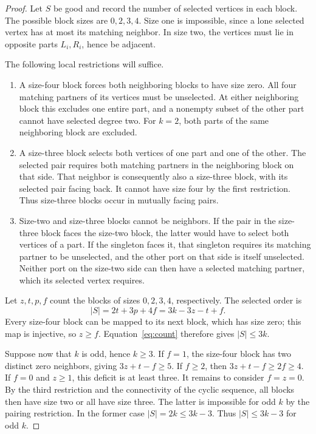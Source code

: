 \documentclass[11pt]{article}
\begin{document}
\begin{proof}
Let $S$ be good and record the number of selected vertices in each
block. The possible block sizes are $0,2,3,4$.
Size one is impossible, since a lone selected vertex has at most its
matching neighbor. In size two, the vertices must lie in opposite
parts $L_i,R_i$, hence be adjacent.

The following local restrictions will suffice.
\begin{enumerate}
\item A size-four block forces both neighboring blocks to have size
zero. All four matching partners of its vertices must be unselected.
At either neighboring block this excludes one entire part, and a
nonempty subset of the other part cannot have selected degree two.
For $k=2$, both parts of the same neighboring block are excluded.
\item A size-three block selects both vertices of one part and one of
the other. The selected pair requires both matching partners in the
neighboring block on that side. That neighbor is consequently also
a size-three block, with its selected pair facing back.
It cannot have size four by the first restriction.
Thus size-three blocks occur in mutually facing pairs.
\item Size-two and size-three blocks cannot be neighbors.
If the pair in the size-three block faces the size-two block, the
latter would have to select both vertices of a part.
If the singleton faces it, that singleton requires its matching
partner to be unselected, and the other port on that side is itself
unselected. Neither port on the size-two side can then have a selected
matching partner, which its selected vertex requires.
\end{enumerate}

Let $z,t,p,f$ count the blocks of sizes $0,2,3,4$, respectively.
The selected order is
\begin{equation}\label{eq:count}
 |S|=2t+3p+4f=3k-3z-t+f.
\end{equation}
Every size-four block can be mapped to its next block, which has size
zero; this map is injective, so $z\geq f$.
Equation~\eqref{eq:count} therefore gives $|S|\leq3k$.

Suppose now that $k$ is odd, hence $k\geq3$.
If $f=1$, the size-four block has two distinct zero neighbors, giving
$3z+t-f\geq5$. If $f\geq2$, then $3z+t-f\geq2f\geq4$.
If $f=0$ and $z\geq1$, this deficit is at least three.
It remains to consider $f=z=0$.
By the third restriction and the connectivity of the cyclic sequence,
all blocks then have size two or all have size three.
The latter is impossible for odd $k$ by the pairing restriction.
In the former case $|S|=2k\leq3k-3$.
Thus $|S|\leq3k-3$ for odd $k$.


\end{proof}
\end{document}
